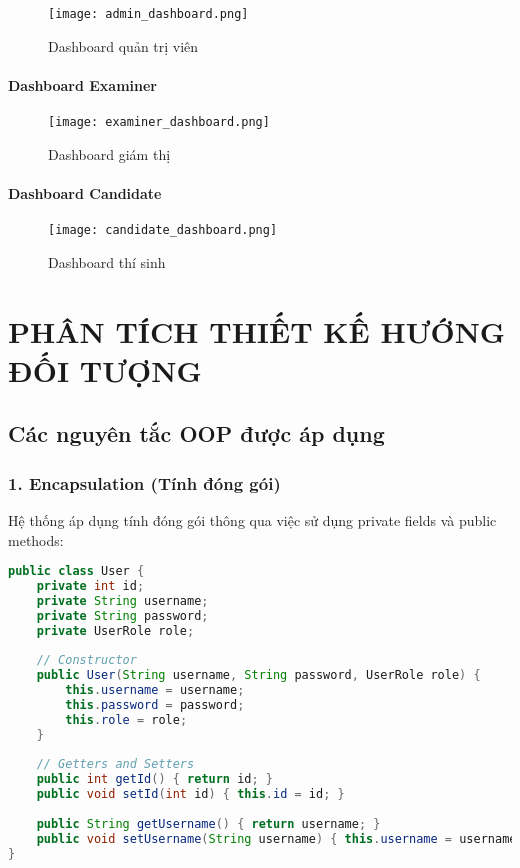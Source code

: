 \documentclass[12pt,a4paper]{article}
\begin{document}
\begin{figure}[H]
\centering
\texttt{[image: admin\_dashboard.png]}
\caption{Dashboard quản trị viên}
\label{fig:admin_dashboard}
\end{figure}

\paragraph{Dashboard Examiner}

\begin{figure}[H]
\centering
\texttt{[image: examiner\_dashboard.png]}
\caption{Dashboard giám thị}
\label{fig:examiner_dashboard}
\end{figure}

\paragraph{Dashboard Candidate}

\begin{figure}[H]
\centering
\texttt{[image: candidate\_dashboard.png]}
\caption{Dashboard thí sinh}
\label{fig:candidate_dashboard}
\end{figure}

\section{PHÂN TÍCH THIẾT KẾ HƯỚNG ĐỐI TƯỢNG}

\subsection{Các nguyên tắc OOP được áp dụng}

\subsubsection{1. Encapsulation (Tính đóng gói)}

Hệ thống áp dụng tính đóng gói thông qua việc sử dụng private fields và public methods:

\begin{lstlisting}[language=Java, caption=Ví dụ về Encapsulation trong class User]
public class User {
    private int id;
    private String username;
    private String password;
    private UserRole role;
    
    // Constructor
    public User(String username, String password, UserRole role) {
        this.username = username;
        this.password = password;
        this.role = role;
    }
    
    // Getters and Setters
    public int getId() { return id; }
    public void setId(int id) { this.id = id; }
    
    public String getUsername() { return username; }
    public void setUsername(String username) { this.username = username; }
}
\end{lstlisting}
\end{document}
